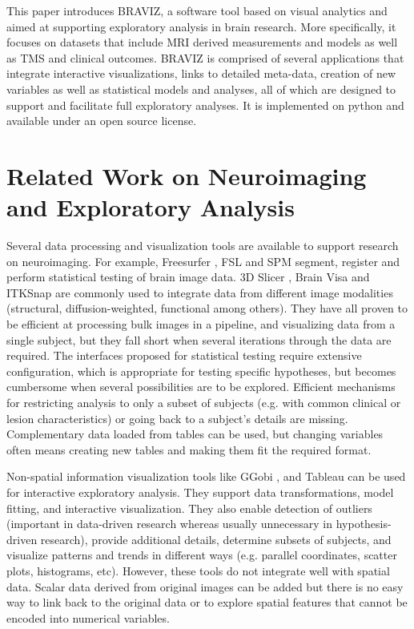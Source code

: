 \documentclass{frontiersHLTH}
\begin{document}
This paper introduces BRAVIZ, a software tool based on visual analytics and aimed at supporting exploratory analysis in brain research. More specifically, it focuses on datasets that include MRI derived measurements and models 
as well as TMS and clinical outcomes. BRAVIZ is comprised of several applications that integrate interactive visualizations, links to detailed meta-data, creation of new variables as well as statistical models and analyses, all of which are designed to support and facilitate full exploratory analyses. It is implemented on python and available under an open source license.

\section{Related Work on Neuroimaging and Exploratory Analysis}


Several data processing and visualization tools are available to support research on neuroimaging. For example, Freesurfer \cite{fischl_freesurfer_2012}, FSL \cite{jenkinson_fsl_2012} and SPM \cite{friston_statistical_2006} segment, register and perform statistical testing of brain image data. 3D Slicer \cite{fedorov_3d_2012}, Brain Visa \cite{cointepas_brainvisa:_2001} and ITKSnap \cite{yushkevich_user-guided_2006} are commonly used to integrate data from different image modalities (structural, diffusion-weighted, functional among others). They have all proven to be efficient at processing bulk images in a pipeline, and visualizing data from a single subject, but they fall short when several iterations through the data are required. The interfaces proposed for statistical testing require extensive configuration, which is appropriate for testing specific hypotheses, but becomes cumbersome when several possibilities are to be explored. Efficient mechanisms for restricting analysis to only a subset of subjects   (e.g. with common clinical or lesion characteristics) or going back to a subject's details are missing. Complementary data loaded from tables can be used, but changing variables often means creating new tables and making them fit the required format.


Non-spatial information visualization tools like GGobi \cite{cook_interactive_2007}, and Tableau\cite{hanrahan_tableau_2003} can be used for interactive exploratory analysis. They support data transformations, model fitting, and interactive visualization. They also enable  detection of outliers (important in data-driven research whereas usually unnecessary in hypothesis-driven research), provide additional details, determine subsets of subjects, and visualize patterns and trends in different ways (e.g. parallel coordinates, scatter plots, histograms, etc). However, these tools do not integrate well with spatial data. Scalar data derived from original images can be added but there is no easy way to link back to the original data or to explore spatial features that cannot be encoded into numerical variables.
\end{document}
